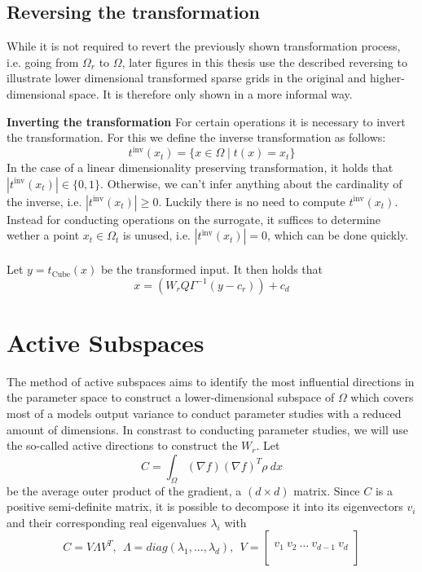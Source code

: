 \documentclass[
  a4paper,  %
  twoside,  %
  bibliography=totoc,
  headsepline,
  cleardoublepage=empty,
  parskip=half,
  draft=false
]{scrbook}
\begin{document}
\subsection{Reversing the transformation}

While it is not required to revert the previously shown transformation process, i.e. going from $\Omega_r$ to $\Omega$, later figures in this thesis use the described reversing to illustrate lower dimensional transformed sparse grids in the original and higher-dimensional space.
It is therefore only shown in a more informal way.

\textbf{Inverting the transformation  }
For certain operations it is necessary to invert the transformation.
For this we define the inverse transformation as follows:
\begin{equation}
t^{\text{inv}}(x_{t})=\{x \in \Omega \mid t(x)=x_{t}\}
\end{equation}
In the case of a linear dimensionality preserving transformation, it holds that $|t^{\text{inv}}(x_{t})| \in \{0,1\}$.
Otherwise, we can't infer anything about the cardinality of the inverse, i.e. $|t^{\text{inv}}(x_{t})| \geq 0$.
Luckily there is no need to compute $t^{\text{inv}}(x_{t})$. Instead for conducting operations on the surrogate, it suffices to determine wether a point $x_t \in \Omega_t$ is unused, i.e. $|t^{\text{inv}}(x_{t})| = 0$, which can be done quickly.
\\
\\

Let $y=t_{\text{Cube}}(x)$ be the transformed input. It then holds that
\begin{equation}
x=(W_r Q \Gamma^{-1} (y - c_r)) + c_d
\end{equation}

\section{Active Subspaces}


The method of active subspaces \cite{CG15} aims to identify the most influential directions in the parameter space to construct a lower-dimensional subspace of $\Omega$ which covers most of a models output variance to conduct parameter studies with a reduced amount of dimensions.
In constrast to conducting parameter studies, we will use the so-called active directions to construct the $W_r$.
Let
\begin{equation}
C = \int_{\Omega} (\nabla f) (\nabla f)^T \rho ~ dx
\label{as_c}
\end{equation}
be the average outer product of the gradient, a $(d \times d)$ matrix.
Since $C$ is a positive semi-definite matrix, it is possible to decompose it into its eigenvectors $v_i$ and their corresponding real eigenvalues $\lambda_i$ with
\begin{equation}
C = V \Lambda V^T, ~~ \Lambda = diag(\lambda_1, ..., \lambda_d), ~~ V=
  \begin{bmatrix}
  \\
    v_1 ~ v_2 ~ \dots ~ v_{d-1} ~ v_d\\
    \\
  \end{bmatrix}
\nonumber
\end{equation}
\end{document}
